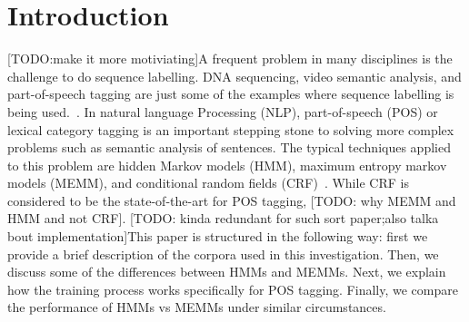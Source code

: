 \section{Introduction}
[TODO:make it more motiviating]A frequent problem in many disciplines is the challenge to do sequence labelling. DNA sequencing, video semantic analysis, and part-of-speech tagging are just some of the examples where sequence labelling is being used.~\cite{dnaEx, videoEx, nlpEx}. In natural language Processing (NLP), part-of-speech (POS) or lexical category tagging is an important stepping stone to solving more complex problems such as semantic analysis of sentences. The typical techniques applied to this problem are hidden Markov models (HMM), maximum entropy markov models (MEMM), and conditional random fields (CRF)~\cite{nlpBook}. While CRF is considered to be the state-of-the-art for POS tagging, [TODO: why MEMM and HMM and not CRF]. [TODO: kinda redundant for such sort paper;also talka bout implementation]This paper is structured in the following way: first we provide a brief description of the corpora used in this investigation. Then, we discuss some of the differences between HMMs and MEMMs. Next, we explain how the training process works specifically for POS tagging. Finally, we compare the performance of HMMs vs MEMMs under similar circumstances.
